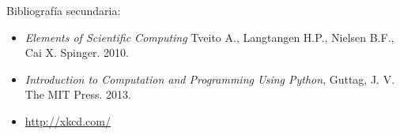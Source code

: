 \documentclass[letterpaper,10pt,onecolumn]{article}
\begin{document}
\noindent\normalsize Bibliograf\'ia secundaria:
\begin{itemize}
\item
\textit{Elements of Scientific Computing}
Tveito A., Langtangen H.P., Nielsen B.F., Cai X. Spinger. 2010.


\item 
\textit{Introduction to Computation and Programming Using Python},
Guttag, J. V. The MIT Press. 2013.

\item\url{http://xkcd.com/}
\end{itemize}
\end{document}
